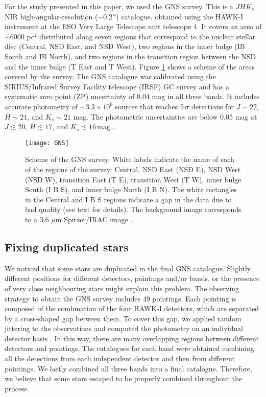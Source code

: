 \documentclass{aa}
\begin{document}
For the study presented in this paper, we used the GNS survey. This is a $JHK_s$ NIR high-angular-resolution ($\sim 0.2''$) catalogue, obtained using the HAWK-I instrument \citep{Kissler-Patig:2008uq} at the ESO Very Large Telescope unit telescope 4. It covers an area of $\sim 6000$ pc$^2$ distributed along seven regions that correspond to the nuclear stellar disc (Central, NSD East, and NSD West), two regions in the inner bulge (IB South and IB North), and two regions in the transition region between the NSD and the inner bulge (T East and T West). Figure \ref{GNS} shows a scheme of the areas covered by the survey. The GNS catalogue was calibrated using the SIRIUS/Infrared Survey Facility telescope (IRSF) GC survey \citep[e.g.][]{Nagayama:2003fk,Nishiyama:2006tx} and has a systematic zero point (ZP) uncertainty of 0.04 mag in all three bands. It includes accurate photometry of $\sim 3.3\times 10^6$ sources that reaches  5\,$\sigma$ detections for $J\sim22$, $H\sim21$, and $K_s\sim21$ mag. The photometric uncertainties are below 0.05 mag at $J\lesssim20$, $H\lesssim17$, and $K_s\lesssim16$\,mag \citep{Nogueras-Lara:2019aa}.


   \begin{figure}
   \texttt{[image: GNS]}
   \caption{Scheme of the GNS survey. White labels indicate the name of each of the regions of the survey: Central, NSD East (NSD E), NSD West (NSD W), transition East (T E), transition West (T W), inner bulge South (I B S), and inner bulge North (I B N). The white rectangles in the Central and I B S regions indicate a gap in the data due to bad quality (see text for details). The background image corresponds to a 3.6 $\mu$m Spitzer/IRAC image \citep{Stolovy:2006fk}.}

   \label{GNS}
    \end{figure}




\subsection{Fixing duplicated stars}
\label{dupli}


We noticed that some stars are duplicated in the final GNS catalogue. Slightly different positions for different detectors, pointings and/or bands, or the presence of very close neighbouring stars might explain this problem. The observing strategy to obtain the GNS survey includes 49 pointings. Each pointing is composed of the combination of the four HAWK-I detectors, which are separated by a cross-shaped gap between them. To cover this gap, we applied random jittering to the observations and computed the photometry on an individual detector basis \citep[for further details, see][]{Nogueras-Lara:2019aa}. In this way, there are many overlapping regions between different detectors and pointings. The catalogues for each band were obtained combining all the detections from each independent detector and then from different pointings. We lastly combined all three bands into a final catalogue. Therefore, we believe that some stars escaped to be properly combined throughout the process.
 
\end{document}
